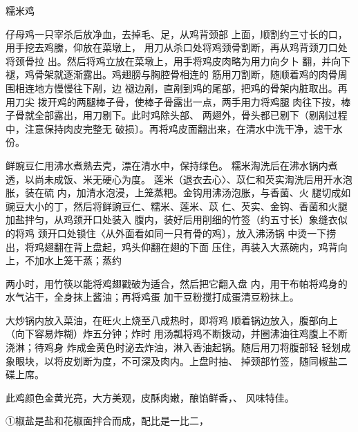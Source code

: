 \begin{recipe}[八宝糯米鸡]{糯米鸡}

\ingredients


\cooking

\step 	仔母鸡一只宰杀后放净血，去掉毛、足，从鸡背颈部 上面，顺割约三寸长的口，用手挖去鸡縢，仰放在菜墩上， 用刀从杀口处将鸡颈骨割断，再从鸡背颈刀口处将颈骨拉 出。然后将鸡立放在菜墩上，用手将鸡皮肉略为用力向夕卜 翻，并向下褪，鸡骨架就逐渐露出。鸡翅膀与胸腔骨相连的 筋用刀割断，随顺着鸡的肉骨周围相连地方慢慢往下剐，边 褪边剐，直剐到鸡的尾部，把鸡的骨架内脏取出。再用刀尖 拨开鸡的两腿棒子骨，使棒子骨露出一点，两手用力将鸡腿 肉往下按，棒子骨就全部露出，用刀剔下。此时鸡除头部、 两翅外，骨头都已剔下（剔剐过程中，注意保持肉皮完整无 破损〕。再将鸡皮面翻出来，在清水中洗干净，滤干水份。

\step 	鲜豌豆仁用沸水煮熟去壳，漂在清水中，保持绿色。 糯米淘洗后在沸水锅内煮透，以尚未成饭、米无硬心为度。 莲米（退衣去心〉、苡仁和芡实淘洗后用开水泡胀，装在硫 内，加清水泡浸，上笼蒸粑。金钩用沸汤泡胀，与香菌、火 腿切成如豌豆大小的丁，然后将鲜豌豆仁、糯米、莲米、苡 仁、芡实、金钩、香菌和火腿加盐拌匀，从鸡颈开口处装入 腹内，装好后用削细的竹签（约五寸长）象缝衣似的将鸡 颈开口处锁住〈从外面看如同一只有骨的鸡〕，放入沸汤锅 中烫一下捞出，将鸡翅翻在背上盘起，鸡头仰翻在翅的下面 压住，再装入大蒸碗内，鸡背向上，不加水上笼干蒸；蒸约

两小时，用竹筷以能将鸡翅戳破为适合，然后把它翻入盘 内，用干布帕将鸡身的水气沾干，全身抹上酱油；再将鸡蛋 加干豆粉搅打成蛋清豆粉抹上。

\step 大炒锅内放入菜油，在旺火上烧至八成热时，即将鸡 顺着锅边放入，腹部向上（向下容易炸糊）炸五分钟；炸时 用汤瓢将鸡不断拨动，并圈沸油往鸡腹上不断浇淋；待鸡身 炸成金黄色时泌去炸油，淋入香油起锅。随后用刀将腹部轻 轻划成象眼块，以将皮划断为度，不可深及肉内。上盘时抽、 掉颈部竹签，随同椒盐二碟上席。

\notes

此鸡颜色金黄光亮，大方美观，皮酥肉嫩，酿馅鲜香，、 风味特佳。

①椒盐是盐和花椒面拌合而成，配比是一比二，

\end{recipe}


